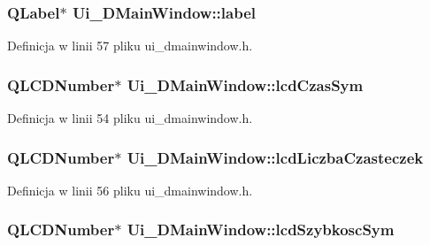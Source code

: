 \subsubsection[{label}]{\setlength{\rightskip}{0pt plus 5cm}Q\+Label$\ast$ Ui\+\_\+\+D\+Main\+Window\+::label}\label{class_ui___d_main_window_aa528e417bc72cda19dfcea49f1617b2a}


Definicja w linii 57 pliku ui\+\_\+dmainwindow.\+h.

\hypertarget{class_ui___d_main_window_af49335a21dc17e53674f8b62a640ca2d}{}
\subsubsection[{lcd\+Czas\+Sym}]{\setlength{\rightskip}{0pt plus 5cm}Q\+L\+C\+D\+Number$\ast$ Ui\+\_\+\+D\+Main\+Window\+::lcd\+Czas\+Sym}\label{class_ui___d_main_window_af49335a21dc17e53674f8b62a640ca2d}


Definicja w linii 54 pliku ui\+\_\+dmainwindow.\+h.

\hypertarget{class_ui___d_main_window_a3d6afe29d882b3a9119b68d79c9b5e0f}{}
\subsubsection[{lcd\+Liczba\+Czasteczek}]{\setlength{\rightskip}{0pt plus 5cm}Q\+L\+C\+D\+Number$\ast$ Ui\+\_\+\+D\+Main\+Window\+::lcd\+Liczba\+Czasteczek}\label{class_ui___d_main_window_a3d6afe29d882b3a9119b68d79c9b5e0f}


Definicja w linii 56 pliku ui\+\_\+dmainwindow.\+h.

\hypertarget{class_ui___d_main_window_a4eb8e2a87080f4f314eb96c52a82e39d}{}
\subsubsection[{lcd\+Szybkosc\+Sym}]{\setlength{\rightskip}{0pt plus 5cm}Q\+L\+C\+D\+Number$\ast$ Ui\+\_\+\+D\+Main\+Window\+::lcd\+Szybkosc\+Sym}\label{class_ui___d_main_window_a4eb8e2a87080f4f314eb96c52a82e39d}


